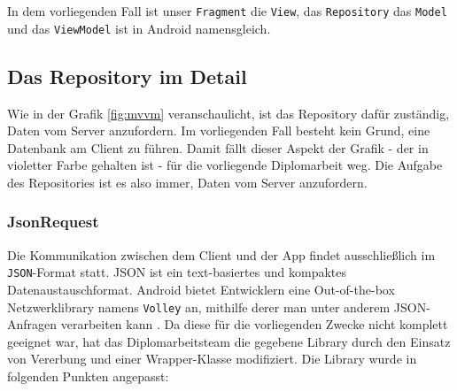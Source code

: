 In dem vorliegenden Fall ist unser \texttt{Fragment} die \texttt{View},
das \texttt{Repository} das \texttt{Model} und das \texttt{ViewModel}
ist in Android namensgleich.

\hypertarget{das-repository-im-detail}{%
\subsection{Das Repository im Detail}\label{das-repository-im-detail}}

Wie in der Grafik \ref{fig:mvvm} veranschaulicht, ist das Repository
dafür zuständig, Daten vom Server anzufordern. Im vorliegenden Fall
besteht kein Grund, eine Datenbank am Client zu führen. Damit fällt
dieser Aspekt der Grafik - der in violetter Farbe gehalten ist - für die
vorliegende Diplomarbeit weg. Die Aufgabe des Repositories ist es also
immer, Daten vom Server anzufordern.

\hypertarget{jsonrequest}{%
\subsubsection{JsonRequest}\label{jsonrequest}}

Die Kommunikation zwischen dem Client und der App findet ausschließlich
im \texttt{JSON}-Format statt. JSON ist ein text-basiertes und kompaktes
Datenaustauschformat. Android bietet Entwicklern eine Out-of-the-box
Netzwerklibrary namens \texttt{Volley} an, mithilfe derer man unter
anderem JSON-Anfragen verarbeiten kann \cite{volley}. Da diese für die
vorliegenden Zwecke nicht komplett geeignet war, hat das
Diplomarbeitsteam die gegebene Library durch den Einsatz von Vererbung
und einer Wrapper-Klasse modifiziert. Die Library wurde in folgenden
Punkten angepasst:

